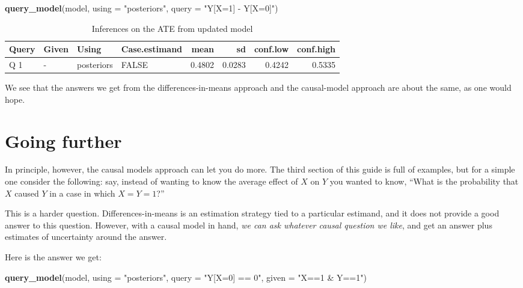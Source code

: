 \documentclass[
  12pt,
]{book}
\newenvironment{Shaded}{\begin{snugshade}}{\end{snugshade}}
\newcommand{\AttributeTok}[1]{\textcolor[rgb]{0.13,0.29,0.53}{#1}}
\newcommand{\FunctionTok}[1]{\textcolor[rgb]{0.13,0.29,0.53}{\textbf{#1}}}
\newcommand{\NormalTok}[1]{#1}
\newcommand{\StringTok}[1]{\textcolor[rgb]{0.31,0.60,0.02}{#1}}
\begin{document}
\begin{Shaded}
\begin{Highlighting}[]
\FunctionTok{query\_model}\NormalTok{(model, }\AttributeTok{using  =} \StringTok{"posteriors"}\NormalTok{, }\AttributeTok{query =} \StringTok{"Y[X=1] {-} Y[X=0]"}\NormalTok{) }
\end{Highlighting}
\end{Shaded}

\begin{table}

\caption{\label{tab:unnamed-chunk-9}Inferences on the ATE from updated model}
\centering
\begin{tabular}[t]{l|l|l|l|r|r|r|r}
\hline
Query & Given & Using & Case.estimand & mean & sd & conf.low & conf.high\\
\hline
Q 1 & - & posteriors & FALSE & 0.4802 & 0.0283 & 0.4242 & 0.5335\\
\hline
\end{tabular}
\end{table}

We see that the answers we get from the differences-in-means approach and the causal-model approach are about the same, as one would hope.

\hypertarget{going-further}{%
\section{Going further}\label{going-further}}

In principle, however, the causal models approach can let you do more. The third section of this guide is full of examples, but for a simple one consider the following: say, instead of wanting to know the average effect of \(X\) on \(Y\) you wanted to know, ``What is the probability that \(X\) caused \(Y\) in a case in which \(X=Y=1\)?''

This is a harder question. Differences-in-means is an estimation strategy tied to a particular estimand, and it does not provide a good answer to this question. However, with a causal model in hand, \emph{we can ask whatever causal question we like}, and get an answer plus estimates of uncertainty around the answer.

Here is the answer we get:

\begin{Shaded}
\begin{Highlighting}[]
\FunctionTok{query\_model}\NormalTok{(model, }
            \AttributeTok{using =} \StringTok{"posteriors"}\NormalTok{, }
            \AttributeTok{query =} \StringTok{"Y[X=0] == 0"}\NormalTok{,}
            \AttributeTok{given =} \StringTok{"X==1 \& Y==1"}\NormalTok{)  }
\end{Highlighting}
\end{Shaded}
\end{document}

